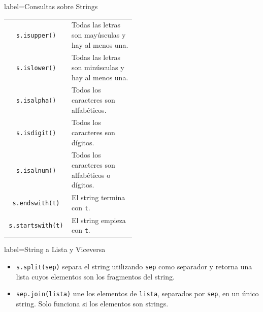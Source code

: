 \documentclass[10pt]{article}
\begin{document}
\begin{multicols*}{3}
\begin{contentbox}{label=Consultas sobre Strings}
    \begin{tabular}{C|p{0.5\linewidth}}
        \lstinline!s.isupper()! & Todas las letras son mayúsculas y hay al menos una. \\
        \lstinline!s.islower()! & Todas las letras son minúsculas y hay al menos una. \\
        \lstinline!s.isalpha()! & Todos los caracteres son alfabéticos. \\
        \lstinline!s.isdigit()! & Todos los caracteres son dígitos. \\
        \lstinline!s.isalnum()! & Todos los caracteres son alfabéticos o dígitos. \\
        \lstinline!s.endswith(t)! & El string termina con \texttt{t}. \\
        \lstinline!s.startswith(t)! & El string empieza con \texttt{t}.
    \end{tabular}
\end{contentbox}

\begin{contentbox}{label=String a Lista y Viceversa}
    \begin{itemize}
        \item \lstinline!s.split(sep)! separa el string utilizando \texttt{sep} como separador y retorna una lista cuyos elementos son los fragmentos del string.
        \item \lstinline!sep.join(lista)! une los elementos de \texttt{lista}, separados por \texttt{sep}, en un único string. Solo funciona si los elementos son strings.
    \end{itemize}
\end{contentbox}


\end{multicols*}
\end{document}
